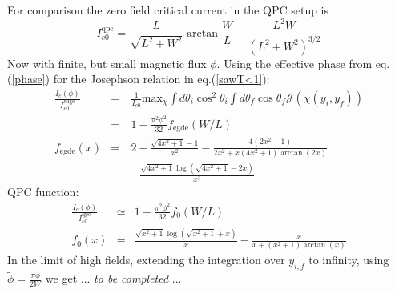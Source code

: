 \documentclass[a4paper]{article}
\begin{document}
For comparison the zero field critical current in the QPC setup is
	\begin{equation}
	I^{\text{qpc}}_{c0} =
	\frac{L}{\sqrt{L^2+W^2}}\arctan\frac{W}{L} + \frac{L^2W}{(L^2+W^2)^{3/2}}
	\label{Ic-0}
	\end{equation}	
Now with finite, but small magnetic flux $\phi$. Using the effective phase from eq. (\ref{phase}) for the Josephson relation in eq.(\ref{sawT<1}):
	\begin{eqnarray}
	\frac{I_c(\phi)}{I^{\text{edge}}_{c0}} &=& \frac{1}{I_{c0}} \text{max}_{\chi} \int d \theta_i \cos^2 \theta_i\int d \theta_f \cos \theta_f \mathcal{J}(\tilde{\chi}(y_i, y_f)) \\
	&=& 1 - \frac{\pi^2 \phi^2}{32}f_{\text{egde}}(W/L) \\
	f_{\text{egde}}(x) &=& 2 -\frac{\sqrt{4 x^2+1} -1}{x^2} - \frac{4 \left(2 x^2+1\right)}{2 x^2 + x\left(4 x^2+1\right) \arctan(2 x)} \\
	&\quad& - \frac{\sqrt{4 x^2+1} \log \left(\sqrt{4 x^2+1}-2 x\right)}{x^3}
	\end{eqnarray}
QPC function:
	\begin{eqnarray}
	\frac{I_c(\phi)}{I^{\text{qpc}}_{c0}}&\simeq& 1 - \frac{\pi ^2 \phi^2 }{32} f_0(W/L) \\
	f_0(x) &=& \frac{\sqrt{x^2+1} \log \left(\sqrt{x^2+1}+x\right)}{x}- \frac{x}{x+\left(x^2+1\right) \arctan(x)} 
	\end{eqnarray}
In the limit of high fields, extending the integration over $y_{i,f}$ to infinity, using $ \tilde{\phi} = \frac{\pi \phi}{2 W} $ we get ... \textit{to be completed} ...

\end{document}
